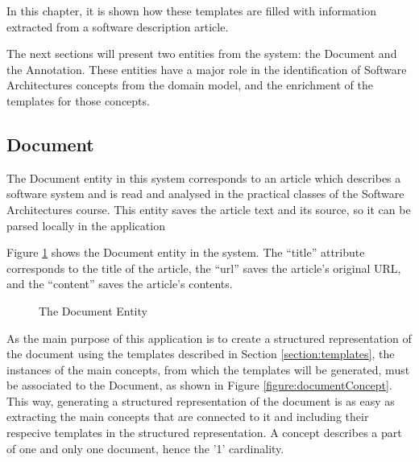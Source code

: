 \documentclass{llncs}
\begin{document}
In this chapter, it is shown how these templates are filled with information extracted from a software description article.

The next sections will present two entities from the system: the Document and the Annotation. These entities have a major role in the identification of Software Architectures concepts from the domain model, and the enrichment of the templates for those concepts.

\subsection{Document}
\label{section:document}

The Document entity in this system corresponds to an article which describes a software system and is read and analysed in the practical classes of the Software Architectures course. This entity saves the article text and its source, so it can be parsed locally in the application

Figure \ref{figure:documentEntity} shows the Document entity in the system. The ``title'' attribute corresponds to the title of the article, the ``url'' saves the article's original URL, and the ``content'' saves the article's contents.

\begin{figure}
\centering
\renewcommand {\umltextcolor}{black}
\renewcommand {\umlfillcolor}{none}
\renewcommand {\umldrawcolor}{black}

\caption{The Document Entity}
\label{figure:documentEntity}
\end{figure}

As the main purpose of this application is to create a structured representation of the document using the templates described in Section \ref{section:templates}, the instances of the main concepts, from which the templates will be generated, must be associated to the Document, as shown in Figure \ref{figure:documentConcept}. This way, generating a structured representation of the document is as easy as extracting the main concepts that are connected to it and including their respecive templates in the structured representation. A concept describes a part of one and only one document, hence the '1' cardinality.  
\end{document}
